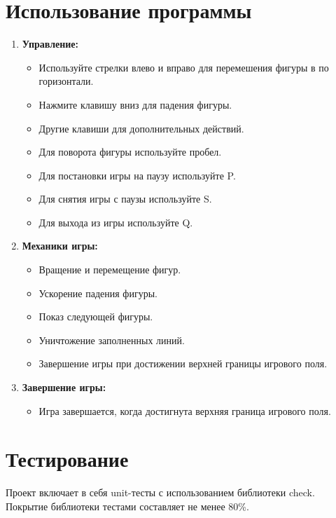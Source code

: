 \documentclass{article}
\begin{document}
\section{Использование программы}

\begin{enumerate}
    \item \textbf{Управление:}
        \begin{itemize}
            \item Используйте стрелки влево и вправо для перемешения фигуры в по горизонтали.
            \item Нажмите клавишу вниз для падения фигуры.
            \item Другие клавиши для дополнительных действий.
            \item Для поворота фигуры используйте пробел.
            \item Для постановки игры на паузу используйте P.
            \item Для снятия игры с паузы используйте S.
            \item Для выхода из игры используйте Q.
        \end{itemize}
    \item \textbf{Механики игры:}
        \begin{itemize}
            \item Вращение и перемещение фигур.
            \item Ускорение падения фигуры.
            \item Показ следующей фигуры.
            \item Уничтожение заполненных линий.
            \item Завершение игры при достижении верхней границы игрового поля.
        \end{itemize}
    \item \textbf{Завершение игры:}
        \begin{itemize}
            \item Игра завершается, когда достигнута верхняя граница игрового поля.
        \end{itemize}
\end{enumerate}

\section{Тестирование}

Проект включает в себя unit-тесты с использованием библиотеки check. Покрытие библиотеки тестами составляет не менее 80\%.
\end{document}

